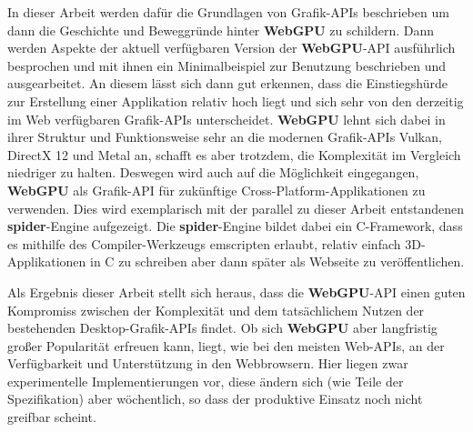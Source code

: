 \documentclass[oneside]{ausarbeitung}
\newcommand*{\quotize}[1]{\glqq #1\grqq}
\begin{document}
In dieser Arbeit werden dafür die Grundlagen von Grafik-APIs beschrieben um dann die Geschichte und Beweggründe hinter \textbf{WebGPU} zu schildern. Dann werden Aspekte der aktuell verfügbaren Version der \textbf{WebGPU}-API ausführlich besprochen und mit ihnen ein Minimalbeispiel zur Benutzung  beschrieben und ausgearbeitet. An diesem lässt sich dann gut erkennen, dass die Einstiegshürde zur Erstellung einer Applikation relativ hoch liegt und sich sehr von den derzeitig im Web verfügbaren Grafik-APIs unterscheidet. \textbf{WebGPU} lehnt sich dabei in ihrer Struktur und Funktionsweise sehr an die \quotize{modernen} Grafik-APIs Vulkan, DirectX 12 und Metal an, schafft es aber trotzdem, die Komplexität im Vergleich niedriger zu halten. Deswegen wird auch auf die Möglichkeit eingegangen, \textbf{WebGPU} als Grafik-API für zukünftige Cross-Platform-Applikationen zu verwenden. Dies wird exemplarisch mit der parallel zu dieser Arbeit entstandenen \textbf{spider}-Engine aufgezeigt. Die \textbf{spider}-Engine bildet dabei ein C-Framework, dass es mithilfe des Compiler-Werkzeugs emscripten erlaubt, relativ einfach 3D-Applikationen in C zu schreiben aber dann später als Webseite zu veröffentlichen.

Als Ergebnis dieser Arbeit stellt sich heraus, dass die \textbf{WebGPU}-API einen guten Kompromiss zwischen der Komplexität und dem tatsächlichem Nutzen der bestehenden Desktop-Grafik-APIs findet. Ob sich \textbf{WebGPU} aber langfristig großer Popularität erfreuen kann, liegt, wie bei den meisten Web-APIs, an der Verfügbarkeit und Unterstützung in den Webbrowsern. Hier liegen zwar experimentelle Implementierungen vor, diese ändern sich (wie Teile der Spezifikation) aber wöchentlich, so dass der produktive Einsatz noch nicht greifbar scheint.

\cleardoublepage
{}
\tableofcontents

\listoffigures

\listoftables

\lstlistoflistings

\end{document}
